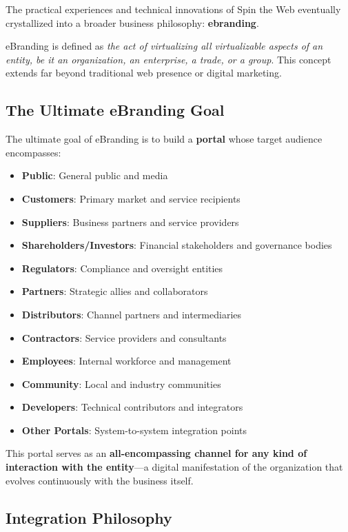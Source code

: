 The practical experiences and technical innovations of Spin the Web eventually crystallized into a broader business philosophy: \textbf{\gls{ebranding}}.

eBranding is defined as \textit{the act of virtualizing all virtualizable aspects of an entity, be it an organization, an enterprise, a trade, or a group}. This concept extends far beyond traditional web presence or digital marketing.

\subsection{The Ultimate eBranding Goal}

The ultimate goal of eBranding is to build a \textbf{portal} whose target audience encompasses:

\begin{itemize}
\item \textbf{Public}: General public and media
\item \textbf{Customers}: Primary market and service recipients
\item \textbf{Suppliers}: Business partners and service providers
\item \textbf{Shareholders/Investors}: Financial stakeholders and governance bodies
\item \textbf{Regulators}: Compliance and oversight entities
\item \textbf{Partners}: Strategic allies and collaborators
\item \textbf{Distributors}: Channel partners and intermediaries
\item \textbf{Contractors}: Service providers and consultants
\item \textbf{Employees}: Internal workforce and management
\item \textbf{Community}: Local and industry communities
\item \textbf{Developers}: Technical contributors and integrators
\item \textbf{Other Portals}: System-to-system integration points
\end{itemize}

This portal serves as an \textbf{all-encompassing channel for any kind of interaction with the entity}—a digital manifestation of the organization that evolves continuously with the business itself.

\subsection{Integration Philosophy}

